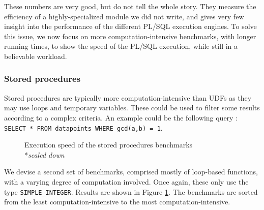 \documentclass[twoside,11pt,a4paper]{article}
\newcommand{\sql}[1]{\texttt{#1}}
\newcommand{\pls}[1]{\small\texttt{#1}\normalsize}
\newcommand{\plstype}[1]{\pls{#1}}
\newcommand{\simpleint}{\plstype{SIMPLE\_INTEGER}}
\begin{document}
These numbers are very good, but do not tell the whole story. They measure the efficiency of a highly-specialized module we did not write, and gives very few insight into the performance of the different PL/SQL execution engines. To solve this issue, we now focus on more computation-intensive benchmarks, with longer running times, to show the speed of the PL/SQL execution, while still in a believable workload.

\subsubsection{Stored procedures}

Stored procedures are typically more computation-intensive than UDFs as they may use loops and temporary variables. These could be used to filter some results according to a complex criteria. An example could be the following query : \sql{SELECT * FROM datapoints WHERE gcd(a,b) = 1}.

\begin{figure}[tp]
	\centering
	\caption[Execution speed of the stored procedures benchmarks]{Execution speed of the stored procedures benchmarks\\
			\hspace*{-5cm}*\textit{scaled down}}
	\label{fig:exp1b}
\end{figure}

We devise a second set of benchmarks, comprised mostly of loop-based functions, with a varying degree of computation involved. Once again, these only use the type \simpleint{}. Results are shown in Figure \ref{fig:exp1b}. The benchmarks are sorted from the least computation-intensive to the most computation-intensive.
\end{document}
